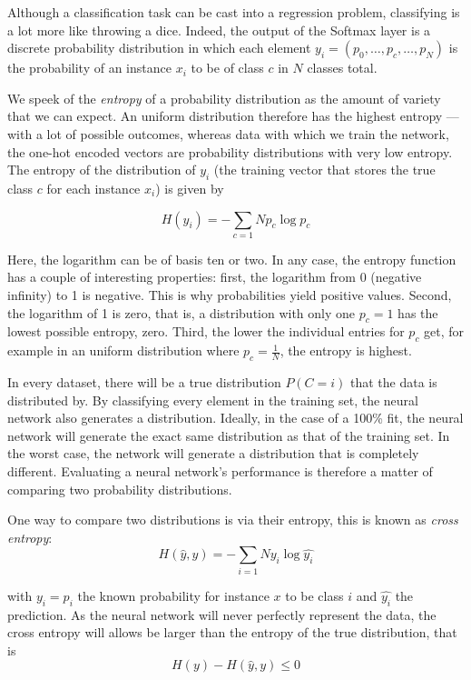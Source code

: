 Although a classification task can be cast into a regression problem, classifying is a lot more like throwing a dice. Indeed, the output of the Softmax layer is a discrete probability distribution in which each element $y_i=(p_0, \dots, p_c, \dots ,p_N)$ is the probability of an instance $x_i$ to be of class $c$ in $N$ classes total.

We speek of the \emph{entropy} of a probability distribution as the amount of variety that we can expect. An uniform distribution therefore has the highest entropy --- with a lot of possible outcomes, whereas data with which we train the network, the one-hot encoded vectors are probability distributions with very low entropy. The entropy of the distribution of $y_i$ (the training vector that stores the true class $c$ for each instance $x_i$) is given by 

\begin{equation}
H(y_i)=-\sum_{c=1}{N}p_c \log p_c
\end{equation}

Here, the logarithm can be of basis ten or two. In any case, the entropy function has a couple of interesting properties: first, the logarithm from 0 (negative infinity) to 1 is negative. This is why probabilities yield positive values. Second, the logarithm of 1 is zero, that is, a distribution with only one $p_c=1$ has the lowest possible entropy, zero. Third, the lower the individual entries for $p_c$ get, for example in an uniform distribution where $p_c=\frac{1}{N}$, the entropy is highest.

In every dataset, there will be a true distribution $P(C=i)$ that the data is distributed by. By classifying every element in the training set, the neural network also generates a distribution. Ideally, in the case of a 100\% fit, the neural network will generate the exact same distribution as that of the training set. In the worst case, the network will generate a distribution that is completely different. Evaluating a neural network's performance is therefore a matter of comparing two probability distributions.

One way to compare two distributions is via their entropy, this is known as \emph{cross entropy}:
\begin{equation}
H(\hat{y},y)=-\sum_{i=1}{N}y_i\log \hat{y_i}
\end{equation}

with $y_i=p_i$ the known probability for instance $x$ to be class $i$ and $\hat{y_i}$ the prediction. As the neural network will never perfectly represent the data, the cross entropy will allows be larger than the entropy of the true distribution, that is
\begin{equation}
H(y)-H(\hat{y},y) \leq 0
\end{equation}

